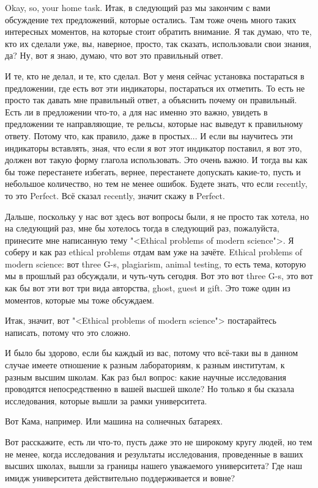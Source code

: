\documentclass[main.tex]{subfiles}
\begin{document}
\newpage
{}

Okay, so, your home task.
Итак, в следующий раз мы закончим с вами обсуждение тех предложений, которые остались.
Там тоже очень много таких интересных моментов, на которые стоит обратить внимание.
Я так думаю, что те, кто их сделали уже, вы, наверное, просто, так сказать, использовали свои знания, да?
Ну, вот я знаю, думаю, что вот это правильный ответ.

И те, кто не делал, и те, кто сделал.
Вот у меня сейчас установка постараться в предложении, где есть вот эти индикаторы, постараться их отметить.
То есть не просто так давать мне правильный ответ, а объяснить почему он правильный.
Есть ли в предложении что-то, а для нас именно это важно, увидеть в предложении те направляющие, те рельсы, которые нас выведут к правильному ответу.
Потому что, как правило, даже в простых...
И если вы научитесь эти индикаторы вставлять, зная, что если я вот этот индикатор поставил, я вот это, должен вот такую форму глагола использовать.
Это очень важно.
И тогда вы как бы тоже перестанете избегать, вернее, перестанете допускать какие-то, пусть и небольшое количество, но тем не менее ошибок.
Будете знать, что если recently, то это Perfect.
Всё сказал recently, значит скажу в Perfect.

Дальше, поскольку у нас вот здесь вот вопросы были, я не просто так хотела, но на следующий раз, мне бы хотелось тогда в следующий раз, пожалуйста, принесите мне написанную тему "<Ethical problems of modern science">.
Я соберу и как раз ethical problems отдам вам уже на зачёте.
Ethical problems of modern science: вот three G-s, plagiarism, animal testing, то есть тема, которую мы в прошлый раз обсуждали, и чуть-чуть сегодня.
Вот это вот three G-s, это вот как бы вот эти вот три вида авторства, ghost, guest и gift.
Это тоже один из моментов, которые мы тоже обсуждаем.

Итак, значит, вот "<Ethical problems of modern science"> постарайтесь написать, потому что это сложно.

И было бы здорово, если бы каждый из вас, потому что всё-таки вы в данном случае имеете отношение к разным лабораториям, к разным институтам, к разным высшим школам.
Как раз был вопрос: какие научные исследования проводятся непосредственно в вашей высшей школе?
Но только я бы сказала исследования, которые вышли за рамки университета.

Вот Кама, например.
Или машина на солнечных батареях.

Вот расскажите, есть ли что-то, пусть даже это не широкому кругу людей, но тем не менее, когда исследования и результаты исследования, проведенные в ваших высших школах, вышли за границы нашего уважаемого университета?
Где наш имидж университета действительно поддерживается и вовне?
\end{document}
